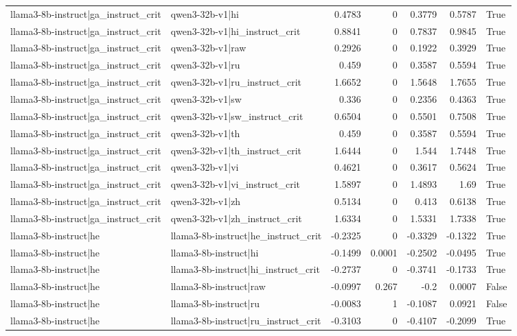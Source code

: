 \begin{table}
\begin{tabular}{l l r r r r l}
llama3-8b-instruct|ga_instruct_crit & qwen3-32b-v1|hi & 0.4783 & 0 & 0.3779 & 0.5787 & True \\
llama3-8b-instruct|ga_instruct_crit & qwen3-32b-v1|hi_instruct_crit & 0.8841 & 0 & 0.7837 & 0.9845 & True \\
llama3-8b-instruct|ga_instruct_crit & qwen3-32b-v1|raw & 0.2926 & 0 & 0.1922 & 0.3929 & True \\
llama3-8b-instruct|ga_instruct_crit & qwen3-32b-v1|ru & 0.459 & 0 & 0.3587 & 0.5594 & True \\
llama3-8b-instruct|ga_instruct_crit & qwen3-32b-v1|ru_instruct_crit & 1.6652 & 0 & 1.5648 & 1.7655 & True \\
llama3-8b-instruct|ga_instruct_crit & qwen3-32b-v1|sw & 0.336 & 0 & 0.2356 & 0.4363 & True \\
llama3-8b-instruct|ga_instruct_crit & qwen3-32b-v1|sw_instruct_crit & 0.6504 & 0 & 0.5501 & 0.7508 & True \\
llama3-8b-instruct|ga_instruct_crit & qwen3-32b-v1|th & 0.459 & 0 & 0.3587 & 0.5594 & True \\
llama3-8b-instruct|ga_instruct_crit & qwen3-32b-v1|th_instruct_crit & 1.6444 & 0 & 1.544 & 1.7448 & True \\
llama3-8b-instruct|ga_instruct_crit & qwen3-32b-v1|vi & 0.4621 & 0 & 0.3617 & 0.5624 & True \\
llama3-8b-instruct|ga_instruct_crit & qwen3-32b-v1|vi_instruct_crit & 1.5897 & 0 & 1.4893 & 1.69 & True \\
llama3-8b-instruct|ga_instruct_crit & qwen3-32b-v1|zh & 0.5134 & 0 & 0.413 & 0.6138 & True \\
llama3-8b-instruct|ga_instruct_crit & qwen3-32b-v1|zh_instruct_crit & 1.6334 & 0 & 1.5331 & 1.7338 & True \\
llama3-8b-instruct|he & llama3-8b-instruct|he_instruct_crit & -0.2325 & 0 & -0.3329 & -0.1322 & True \\
llama3-8b-instruct|he & llama3-8b-instruct|hi & -0.1499 & 0.0001 & -0.2502 & -0.0495 & True \\
llama3-8b-instruct|he & llama3-8b-instruct|hi_instruct_crit & -0.2737 & 0 & -0.3741 & -0.1733 & True \\
llama3-8b-instruct|he & llama3-8b-instruct|raw & -0.0997 & 0.267 & -0.2 & 0.0007 & False \\
llama3-8b-instruct|he & llama3-8b-instruct|ru & -0.0083 & 1 & -0.1087 & 0.0921 & False \\
llama3-8b-instruct|he & llama3-8b-instruct|ru_instruct_crit & -0.3103 & 0 & -0.4107 & -0.2099 & True \\

\end{tabular}
\end{table}
